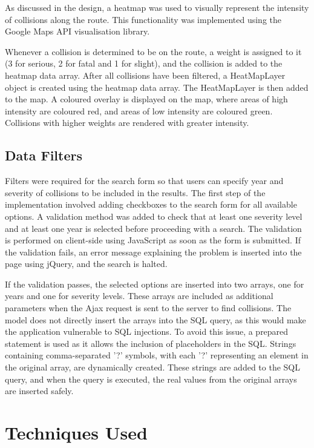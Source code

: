 \documentclass[authoryearcitations]{UoYCSproject}
\begin{document}
As discussed in the design, a heatmap was used to visually represent the intensity of collisions along the route. This functionality was implemented using the Google Maps API visualisation library.

Whenever a collision is determined to be on the route, a weight is assigned to it (3 for serious, 2 for fatal and 1 for slight), and the collision is added to the heatmap data array. After all collisions have been filtered, a HeatMapLayer object is created using the heatmap data array. The HeatMapLayer is then added to the map. A coloured overlay is displayed on the map, where areas of high intensity are coloured red, and areas of low intensity are coloured green. Collisions with higher weights are rendered with greater intensity.

\subsection{Data Filters}

Filters were required for the search form so that users can specify year and severity of collisions to be included in the results. The first step of the implementation involved adding checkboxes to the search form for all available options. A validation method was added to check that at least one severity level and at least one year is selected before proceeding with a search. The validation is performed on client-side using JavaScript as soon as the form is submitted. If the validation fails, an error message explaining the problem is inserted into the page using jQuery, and the search is halted. 

If the validation passes, the selected options are inserted into two arrays, one for years and one for severity levels. These arrays are included as additional parameters when the Ajax request is sent to the server to find collisions. The model does not directly insert the arrays into the SQL query, as this would make the application vulnerable to SQL injections. To avoid this issue, a prepared statement is used as it allows the inclusion of placeholders in the SQL. Strings containing comma-separated '?' symbols, with each '?' representing an element in the original array, are dynamically created. These strings are added to the SQL query, and when the query is executed, the real values from the original arrays are inserted safely.

\section{Techniques Used}
\end{document}
